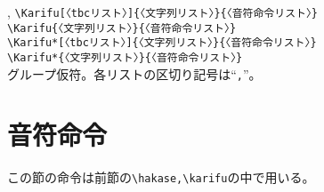 \documentclass[a4paper,luatex]{l3doc}
\begin{document}
\begin{function}{\Karifu,\Karifu*}
 \verb|\Karifu[〈tbcリスト〉]{〈文字列リスト〉}{〈音符命令リスト〉}|\\
 \verb|\Karifu{〈文字列リスト〉}{〈音符命令リスト〉}|\\
 \verb|\Karifu*[〈tbcリスト〉]{〈文字列リスト〉}{〈音符命令リスト〉}|\\
 \verb|\Karifu*{〈文字列リスト〉}{〈音符命令リスト〉}|\\
グループ仮符。各リストの区切り記号は“\verb+,+”。%
\end{function}
\section{音符命令}
この節の命令は前節の\verb|\hakase,\karifu|の中で用いる。
\setlength{\columnseprule}{0.5pt}
\end{document}
